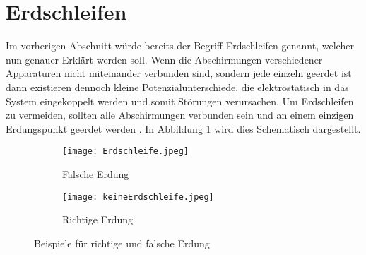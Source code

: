 \section{Erdschleifen}
Im vorherigen Abschnitt würde bereits der Begriff Erdschleifen genannt, welcher nun genauer Erklärt werden soll. Wenn die Abschirmungen verschiedener Apparaturen nicht miteinander verbunden sind, sondern jede einzeln geerdet ist dann existieren dennoch kleine Potenzialunterschiede, die elektrostatisch in das System eingekoppelt werden und somit Störungen verursachen. Um Erdschleifen zu vermeiden, sollten alle Abschirmungen verbunden sein und an einem einzigen Erdungspunkt geerdet werden \citep{VA}. In Abbildung \ref{fig:Erdschleife} wird dies Schematisch dargestellt.
\begin{figure}[h]
    \centering
    \begin{subfigure}{0.45\textwidth}
        \centering
        \texttt{[image: Erdschleife.jpeg]}
        \caption{Falsche Erdung \citep{VA}}
    \end{subfigure}
    \hfill 
    \begin{subfigure}{0.45\textwidth}
        \centering
        \texttt{[image: keineErdschleife.jpeg]}
        \caption{Richtige Erdung \citep{VA}}
    \end{subfigure}
    \caption{Beispiele für richtige und falsche Erdung}
    \label{fig:Erdschleife}
\end{figure}